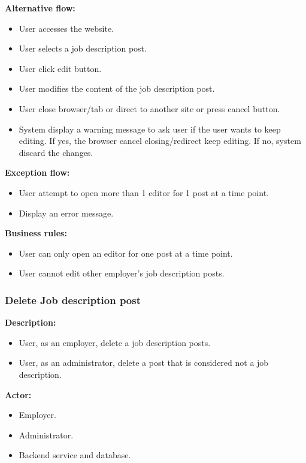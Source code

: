 \documentclass[a4paper]{article}
\begin{document}
        \textbf{Alternative flow:}
        \begin{itemize}
            \item User accesses the website.
            \item User selects a job description post.
            \item User click edit button.
            \item User modifies the content of the job description post.
            \item User close browser/tab or direct to another site or press cancel button.
            \item System display a warning message to ask user if the user wants to keep editing. If yes, the browser cancel closing/redirect keep editing. If no, system discard the changes.
        \end{itemize}

        \textbf{Exception flow:}
        \begin{itemize}
            \item User attempt to open more than 1 editor for 1 post at a time point.
            \item Display an error message.
        \end{itemize}

        \textbf{Business rules:}
        \begin{itemize}
            \item User can only open an editor for one post at a time point.
            \item User cannot edit other employer's job description posts.
        \end{itemize}

        \subsubsection{Delete Job description post}
        \textbf{Description:}
        \begin{itemize}
            \item User, as an employer, delete a job description posts.
            \item User, as an administrator, delete a post that is considered not a job description.
        \end{itemize}

        \textbf{Actor:}
        \begin{itemize}
            \item Employer.
            \item Administrator.
            \item Backend service and database.
        \end{itemize}
\end{document}
